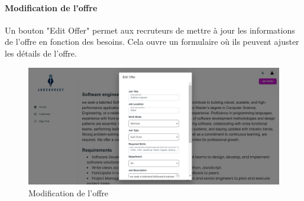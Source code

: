 \paragraph*{Modification de l'offre}
Un bouton "Edit Offer" permet aux recruteurs de mettre 
à jour les informations de l'offre en fonction des besoins. 
Cela ouvre un formulaire où ils peuvent ajuster les détails 
de l'offre.
\begin{figure}[htbp]
   \centering
   \includegraphics[scale=0.2]{screens/editOffer.png}
   \caption{Modification de l'offre}
   \label{fig
   }
   \end{figure}

